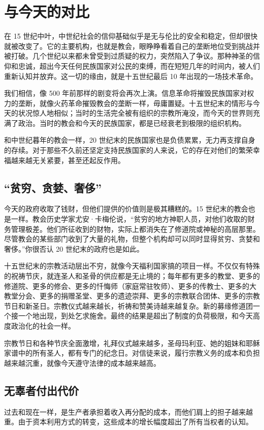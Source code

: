 \section{与今天的对比}
在 15 世纪中叶，中世纪社会的信仰基础似乎是无与伦比的安全和稳定，但却很快就被改变了。它的主要机构，也就是教会，眼睁睁看着自己的垄断地位受到挑战并被打破。几个世纪以来都未曾受到过质疑的权力，突然陷入了争议。那种神圣的信仰和忠诚，超出今天任何民族国家对公民的束缚，而在短短几年的时间内，被人们重新认知并放弃。这一切的缘由，就是十五世纪最后 10 年出现的一场技术革命。

我们相信，像 500 年前那样的剧变将会再次上演。信息革命将摧毁民族国家对权力的垄断，就像火药革命摧毁教会的垄断一样，毋庸置疑。十五世纪末的情形与今天的状况惊人地相似；当时的生活完全被有组织的宗教所淹没，而今天的世界则充满了政治。当时的教会和今天的民族国家，都是已经衰老到极限的组织机构。

和中世纪暮年的教会一样，20 世纪末的民族国家也是负债累累，无力再支撑自身的存续。对于那些不久前还坚定支持民族国家的人来说，它的存在对他们的繁荣幸福越来越无关紧要，甚至还起反作用。

\subsection{“贫穷、贪婪、奢侈”}
今天的政府收取了钱财，但他们提供的价值则是极其糟糕的。15 世纪末的教会也是一样。教会历史学家尤安·卡梅伦说，“贫穷的地方神职人员，对他们收取的财务管理极差。他们所征收到的财物，实际上都消失在了修道院或神秘的高层那里。尽管教会的某些部门收到了大量的礼物，但整个机构却可以同时显得贫穷、贪婪和奢侈。”你很否认 20 世纪末的政府也是如此。

十五世纪末的宗教活动层出不穷，就像今天福利国家搞的项目一样。不仅仅有特殊的祝祷节庆，就连圣人和圣骨的供应都是无止境的；每年都有更多的教堂、更多的修道院、更多的修会、更多的忏悔师（家庭常驻牧师）、更多的传教士、更多的大教堂分会、更多的捐赠圣堂、更多的遗迹崇拜、更多的宗教联合团体、更多的宗教节日和新圣日。宗教仪式越来越长，祈祷和赞美诗越来越复杂。新的募缘修道团一个接一个地出现，到处乞求施舍。最终的结果是超出了制度的负荷极限，和今天高度政治化的社会一样。

宗教节日和各种节庆全面激增，礼拜仪式越来越多，圣母玛利亚、她的姐妹和耶稣家谱中的所有圣人，都有专门的纪念日。对信徒来说，履行宗教义务的成本和负担越来越沉重，就像今天遵守法律的成本越来越高。

\subsection{无辜者付出代价}
过去和现在一样，是生产者承担着收入再分配的成本，而他们肩上的担子越来越重。由于资本利用方式的转变，这些成本的增长幅度超出了所有当权者的认知。

